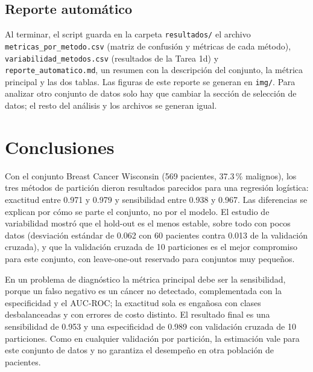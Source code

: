 \documentclass[11pt,letterpaper]{article}
\begin{document}
\subsection{Reporte automático}

Al terminar, el script guarda en la carpeta \texttt{resultados/} el archivo \texttt{metricas\_por\_metodo.csv} (matriz de confusión y métricas de cada método), \texttt{variabilidad\_metodos.csv} (resultados de la Tarea 1d) y \texttt{reporte\_automatico.md}, un resumen con la descripción del conjunto, la métrica principal y las dos tablas. Las figuras de este reporte se generan en \texttt{img/}. Para analizar otro conjunto de datos solo hay que cambiar la sección de selección de datos; el resto del análisis y los archivos se generan igual.

\section{Conclusiones}

Con el conjunto Breast Cancer Wisconsin (569 pacientes, 37.3\,\% malignos), los tres métodos de partición dieron resultados parecidos para una regresión logística: exactitud entre 0.971 y 0.979 y sensibilidad entre 0.938 y 0.967. Las diferencias se explican por cómo se parte el conjunto, no por el modelo. El estudio de variabilidad mostró que el hold-out es el menos estable, sobre todo con pocos datos (desviación estándar de 0.062 con 60 pacientes contra 0.013 de la validación cruzada), y que la validación cruzada de 10 particiones es el mejor compromiso para este conjunto, con leave-one-out reservado para conjuntos muy pequeños.

En un problema de diagnóstico la métrica principal debe ser la sensibilidad, porque un falso negativo es un cáncer no detectado, complementada con la especificidad y el AUC-ROC; la exactitud sola es engañosa con clases desbalanceadas y con errores de costo distinto. El resultado final es una sensibilidad de 0.953 y una especificidad de 0.989 con validación cruzada de 10 particiones. Como en cualquier validación por partición, la estimación vale para este conjunto de datos y no garantiza el desempeño en otra población de pacientes.

\end{document}
